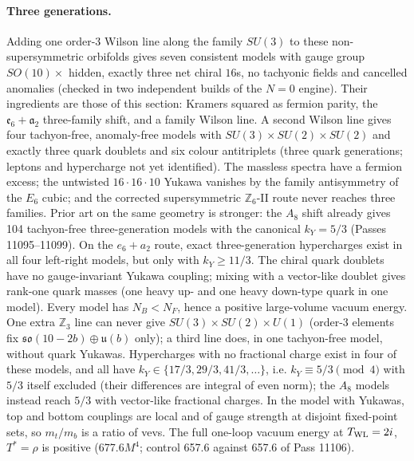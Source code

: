 \paragraph{Three generations.}
Adding one order-$3$ Wilson line along the family $SU(3)$ to these non-supersymmetric orbifolds gives seven consistent
models with gauge group $SO(10)\times$ hidden, exactly three net chiral $16$s, no tachyonic fields and cancelled anomalies
(checked in two independent builds of the $N=0$ engine). Their ingredients are those of this section: Kramers squared
as fermion parity, the $\mathfrak e_6+\mathfrak a_2$ three-family shift, and a family Wilson line. 
A second Wilson line gives four tachyon-free, anomaly-free models with $SU(3)\times SU(2)\times SU(2)$ and exactly three
quark doublets and six colour antitriplets (three quark generations; leptons and hypercharge not yet identified). The
massless spectra have a fermion excess; the untwisted $16\cdot16\cdot10$ Yukawa vanishes by the family antisymmetry of the
$E_6$ cubic; and the corrected supersymmetric $\mathbb Z_6$-II route never reaches three families. 
Prior art on the same geometry is stronger: the $A_8$ shift already gives 104 tachyon-free three-generation models with
the canonical $k_Y=5/3$ (Passes 11095--11099). On the $e_6+a_2$ route, exact three-generation hypercharges exist in all four
left-right models, but only with $k_Y\ge 11/3$. The chiral quark doublets have no gauge-invariant Yukawa coupling; mixing with a
vector-like doublet gives rank-one quark masses (one heavy up- and one heavy down-type quark in one model). Every model has
$N_B<N_F$, hence a positive large-volume vacuum energy. One extra $\mathbb Z_3$ line can never give $SU(3)\times SU(2)\times U(1)$
(order-3 elements fix $\mathfrak{so}(10-2b)\oplus\mathfrak u(b)$ only); a third line does, in one tachyon-free model, without quark Yukawas.
Hypercharges with no fractional charge exist in four of these models, and all have $k_Y\in\{17/3,29/3,41/3,\dots\}$, i.e.
$k_Y\equiv 5/3\pmod 4$ with $5/3$ itself excluded (their differences are integral of even norm); the $A_8$ models instead
reach $5/3$ with vector-like fractional charges. In the model with Yukawas, top and bottom couplings are local and of gauge
strength at disjoint fixed-point sets, so $m_t/m_b$ is a ratio of vevs. The full one-loop vacuum energy at $T_{\rm WL}=2i$,
$T^*=\rho$ is positive (677.6$M^4$; control 657.6 against 657.6 of Pass 11106). 
